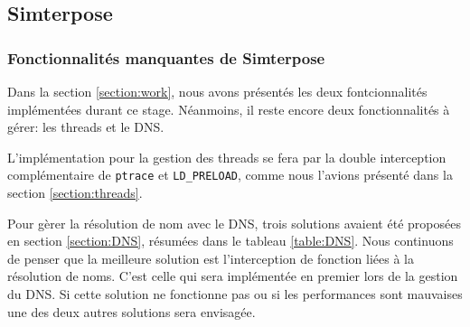 \subsection{Simterpose}
\subsubsection{Fonctionnalités manquantes de Simterpose}
Dans la section \ref{section:work}, nous avons présentés les deux fontcionnalités implémentées durant ce stage. Néanmoins, il reste encore deux fonctionnalités à gérer: les threads et le DNS.

L'implémentation pour la gestion des threads se fera par la double interception complémentaire de \texttt{ptrace} et \texttt{LD\_PRELOAD}, comme nous l'avions présenté dans la section \ref{section:threads}.

Pour gèrer la résolution de nom avec le DNS, trois solutions avaient été proposées en section \ref{section:DNS}, résumées dans le tableau \ref{table:DNS}. Nous continuons de penser que la meilleure solution est l'interception de fonction liées à la résolution de noms. C'est celle qui sera implémentée en premier lors de la gestion du DNS. Si cette solution ne fonctionne pas ou si les performances sont mauvaises une des deux autres solutions sera envisagée.

